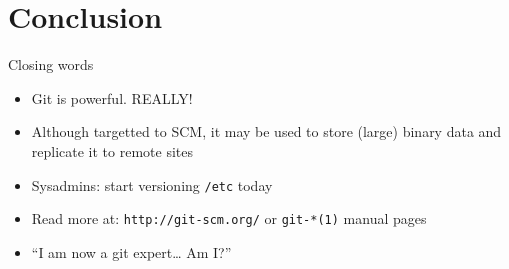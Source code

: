 \section{Conclusion}

\begin{frame}{Closing words}
  \begin{itemize}
  \item Git is powerful. \alert{REALLY!}
  \item Although targetted to SCM, it may be used to store (large) binary data and replicate it to remote sites
  \item Sysadmins: start versioning \texttt{/etc} today
  \item Read more at: \texttt{http://git-scm.org/} or \texttt{git-*(1)} manual pages
  \item ``I am now a git expert\ldots{} Am I?''
  \end{itemize}
\end{frame}

